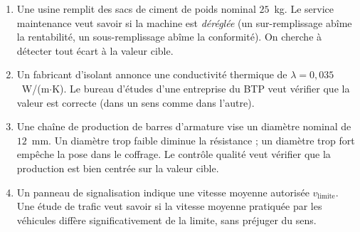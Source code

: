 \begin{enumerate}
  \item Une usine remplit des sacs de ciment de poids nominal $25$~kg. Le service maintenance veut savoir si la machine est \emph{déréglée} (un sur-remplissage abîme la rentabilité, un sous-remplissage abîme la conformité). On cherche à détecter tout écart à la valeur cible.

  \item Un fabricant d'isolant annonce une conductivité thermique de $\lambda = 0{,}035$~W/(m$\cdot$K). Le bureau d'études d'une entreprise du BTP veut vérifier que la valeur est correcte (dans un sens comme dans l'autre).

  \item Une chaîne de production de barres d'armature vise un diamètre nominal de $12$~mm. Un diamètre trop faible diminue la résistance ; un diamètre trop fort empêche la pose dans le coffrage. Le contrôle qualité veut vérifier que la production est bien centrée sur la valeur cible.

  \item Un panneau de signalisation indique une vitesse moyenne autorisée $v_{\text{limite}}$. Une étude de trafic veut savoir si la vitesse moyenne pratiquée par les véhicules diffère significativement de la limite, sans préjuger du sens.

\end{enumerate}

